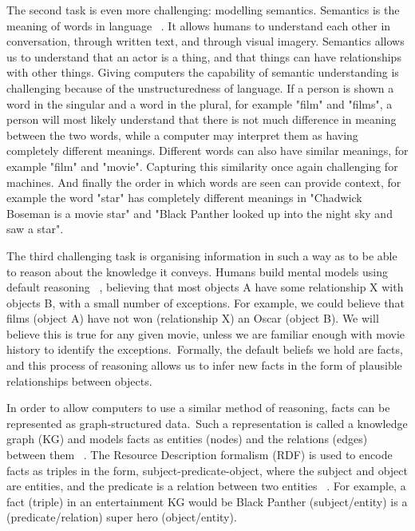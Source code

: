\noindent The second task is even more challenging: modelling semantics. Semantics is the meaning of words in language \unskip~\citep{chomsky1955logical}. It allows humans to understand each other in conversation, through written text, and through visual imagery. Semantics allows us to understand that an actor is a thing, and that things can have relationships with other things. Giving computers the capability of semantic understanding is challenging because of the unstructuredness of language. If a person is shown a word in the singular and a word in the plural, for example "film" and "films", a person will most likely understand that there is not much difference in meaning between the two words, while a computer may interpret them as having completely different meanings. Different words can also have similar meanings, for example "film" and "movie". Capturing this similarity once again challenging for machines. And finally the order in which words are seen can provide context, for example the word "star" has completely different meanings in "Chadwick Boseman is a movie star" and "Black Panther looked up into the night sky and saw a star". \par

\noindent The third challenging task is organising information in such a way as to be able to reason about the knowledge it conveys. Humans build mental models using default reasoning \unskip~\citep{reiter1980logic}, believing that most objects A have some relationship X with objects B, with a small number of exceptions. For example, we could believe that films (object A) have not won (relationship X) an Oscar (object B). We will believe this is true for any given movie, unless we are familiar enough with movie history to identify the exceptions.\ Formally, the default beliefs we hold are facts, and this process of reasoning allows us to infer new facts in the form of plausible relationships between objects. \par

\noindent In order to allow computers to use a similar method of reasoning, facts can be represented as graph-structured data.\ Such a representation is called a knowledge graph (KG) and models facts as entities (nodes) and the relations (edges) between them \unskip~\citep{nickel2015review}. The Resource Description formalism (RDF) is used to encode facts as triples in the form, subject-predicate-object, where the subject and object are entities, and the predicate is a relation between two entities \unskip~\citep{bizer2009dbpedia}. For example, a fact (triple) in an entertainment KG would be Black Panther (subject/entity) is a (predicate/relation) super hero (object/entity). \par

